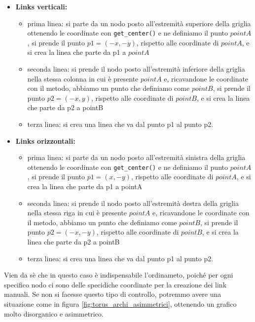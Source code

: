 \documentclass[binding=0.6cm]{sapthesis}
\begin{document}
\begin{itemize}
    \item \textbf{Links verticali:} 
    \begin{itemize}
        \item prima linea: si parte da un nodo posto all'estremità superiore della griglia ottenendo le coordinate con \lstinline|get_center()| e ne definiamo il punto \(pointA\), si prende il punto \(p1 = (-x, -y)\), rispetto alle coordinate di \(pointA\), e si crea la linea che parte da p1 a \(pointA\)
        \item seconda linea: si prende il nodo posto all'estremità inferiore della griglia nella stessa colonna in cui è presente \(pointA\) e, ricavandone le coordinate con il metodo, abbiamo un punto che definiamo come \(pointB\), si prende il punto \(p2 = (-x, y)\), rispetto alle coordinate di \(pointB\), e si crea la linea che parte da p2 a pointB 
        \item terza linea: si crea una linea che va dal punto p1 al punto p2.
    \end{itemize}
    \item \textbf{Links orizzontali:} 
    \begin{itemize}
        \item prima linea: si parte da un nodo posto all'estremità sinistra della griglia ottenendo le coordinate con \lstinline|get_center()| e ne definiamo il punto \(pointA\), si prende il punto \(p1 = (x, -y)\), rispetto alle coordinate di \(pointA\), e si crea la linea che parte da p1 a pointA
        \item seconda linea: si prende il nodo posto all'estremità destra della griglia nella stessa riga in cui è presente \(pointA\) e, ricavandone le coordinate con il metodo, abbiamo un punto che definiamo come \(pointB\), si prende il punto \(p2 = (-x, -y)\), rispetto alle coordinate di \(pointB\), e si crea la linea che parte da p2 a pointB 
        \item terza linea: si crea una linea che va dal punto p1 al punto p2.
    \end{itemize}

\end{itemize}

Vien da sè che in questo caso è indispensabile l'ordinameto, poiché per ogni specifico nodo ci sono delle specidiche coordinate per la creazione dei link manuali.
Se non si facesse questo tipo di controllo, potremmo avere una situazione come in figura \ref{fig:torus_archi_asimmetrici}, ottenendo un grafico
molto disorganico e asimmetrico.
\end{document}
